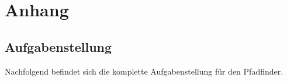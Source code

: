 \documentclass[../main.tex]{subfiles}
\begin{document}
\newpage
\section{Anhang}

\subsection{Aufgabenstellung} \label{aufgabenstellung}

Nachfolgend befindet sich die komplette Aufgabenstellung für den Pfadfinder.


\end{document}
